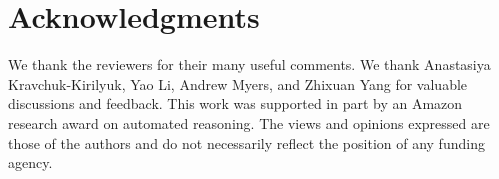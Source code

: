 

\ifacknowledgments
\section*{Acknowledgments}
We thank the reviewers for their many useful comments.  We thank
Anastasiya Kravchuk-Kirilyuk, Yao Li, Andrew Myers, and Zhixuan Yang
for valuable discussions and feedback.
This work was supported in part by an Amazon research award on automated
reasoning.
The views and opinions expressed are those of the authors and do not necessarily
reflect the position of any funding agency.
\fi

\setlength{\bibsep}{.8ex}

